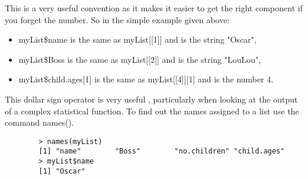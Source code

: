 \begin{frame}[fragile]
	This is a very useful convention as it makes it easier to get the right component if you forget the number. So in the simple example given above: 
	\begin{itemize}
		\item	myList\$name is the same as myList[[1]] and is the string "Oscar", 
		\item	myList\$Boss is the same as myList[[2]] and is the string "LouLou", 
		\item	myList\$child.ages[1] is the same as myList[[4]][1] and is the number 4.
	\end{itemize}
\end{frame}
\begin{frame}[fragile]
	This dollar sign operator is very useful , particularly when looking at the output of a complex statistical function.
	To find out the names assigned to a list use the command names().
	\begin{framed}
		\begin{verbatim}
		> names(myList)
		[1] "name"        "Boss"        "no.children" "child.ages" 
		> myList$name
		[1] "Oscar"
		\end{verbatim}
	\end{framed} 
	
\end{frame}
